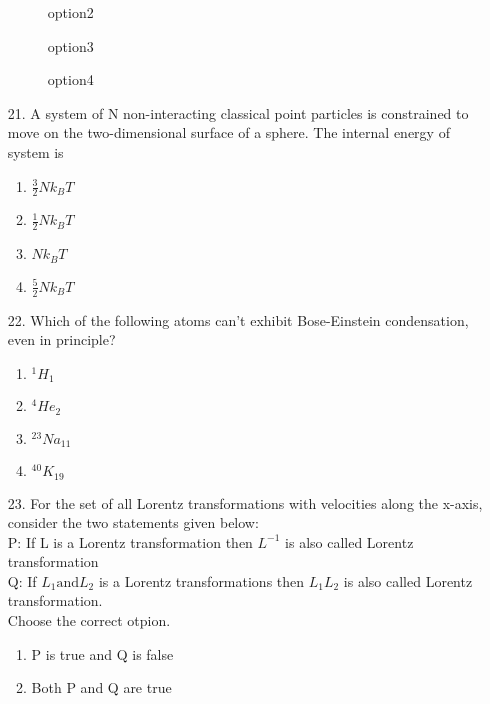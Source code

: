 \documentclass[journal]{IEEEtran}
\begin{document}
\begin{enumerate}
\begin{figure}[!ht]
        \centering
        \caption{option2}
    \end{figure}
    \begin{figure}[!ht]
        \centering
        \caption{option3}
    \end{figure}
    \begin{figure}[!ht]
        \centering
        \caption{option4}
    \end{figure}
    \item[21.] A system of N non-interacting classical point particles is constrained to move on the two-dimensional surface of a sphere. The internal energy of system is 
    \begin{enumerate}[label=(\Alph*)]
        \item $\frac{3}{2}Nk_BT$
        \item $\frac{1}{2}Nk_BT$
        \item $Nk_BT$
        \item $\frac{5}{2}Nk_BT$
    \end{enumerate} 
    \item[22.] Which of the following atoms can't exhibit Bose-Einstein condensation, even in principle?
    \begin{enumerate}[label=(\Alph*)]
        \item $^1H_1$
        \item $^4He_2$
        \item $^{23}Na_{11}$
        \item $^{40}K_{19}$
    \end{enumerate}
    \item[23.] For the set of all Lorentz transformations with velocities along the x-axis, consider the two statements given below:\\
     P: If L is a Lorentz transformation then $L^{-1}$ is also called Lorentz transformation
     \\Q: If $L_1 \text{and} L_2$ is a Lorentz transformations then $L_1L_2$ is also called Lorentz transformation.
     \\Choose the correct otpion.
     \begin{enumerate}[label=(\Alph*)]
        \item P is true and Q is false
        \item Both P and Q are true 

\end{enumerate}
\end{enumerate}
\end{document}
